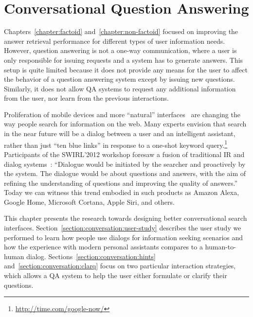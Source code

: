 \chapter{Conversational Question Answering}
\label{chapter:conversation}

Chapters~\ref{chapter:factoid} and~\ref{chapter:non-factoid} focused on improving the answer retrieval performance for different types of user information needs.
However, question answering is not a one-way communication, where a user is only responsible for issuing requests and a system has to generate answers.
This setup is quite limited because it does not provide any means for the user to affect the behavior of a question answering system except by issuing new questions.
Similarly, it does not allow QA systems to request any additional information from the user, nor learn from the previous interactions.

Proliferation of mobile devices and more ``natural'' interfaces~\cite{hearst2011} are changing the way people search for information on the web.
Many experts envision that search in the near future will be a dialog between a user and an intelligent assistant, rather than just ``ten blue links'' in response to a one-shot keyword query.\footnote{\url{http://time.com/google-now/}} 
Participants of the SWIRL'2012 workshop foresaw a fusion of traditional IR and dialog systems~\cite{swirl2012}: ``Dialogue would be initiated by the searcher and proactively by the system.
The dialogue would be about questions and answers, with the aim of refining the understanding of questions and improving the quality of answers.''
Today we can witness this trend embodied in such products as Amazon Alexa, Google Home, Microsoft Cortana, Apple Siri, and others.

This chapter presents the research towards designing better conversational search interfaces.
Section~\ref{section:conversation:user-study} describes the user study we performed to learn how people use dialogs for information seeking scenarios and how the experience with modern personal assistants compares to a human-to-human dialog.
Sections~\ref{section:conversation:hints} and~\ref{section:conversation:clarq} focus on two particular interaction strategies, which allows a QA system to help the user either formulate or clarify their questions.

